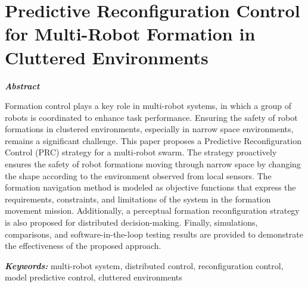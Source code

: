 \chapter{Predictive Reconfiguration Control for Multi-Robot Formation in Cluttered Environments}\label{paper3}

\vspace{1cm}

\noindent\textit{\textbf{Abstract}}

Formation control plays a key role in multi-robot systems, in which a group of robots is coordinated to enhance task performance. Ensuring the safety of robot formations in clustered environments, especially in narrow space environments, remains a significant challenge. This paper proposes a Predictive Reconfiguration Control (PRC) strategy for a multi-robot swarm. The strategy proactively ensures the safety of robot formations moving through narrow space by changing the shape according to the environment observed from local sensors. The formation navigation method is modeled as objective functions that express the requirements, constraints, and limitations of the system in the formation movement mission. Additionally, a perceptual formation reconfiguration strategy is also proposed for distributed decision-making. Finally, simulations, comparisons, and software-in-the-loop testing results are provided to demonstrate the effectiveness of the proposed approach.

\noindent\textbf{\textit{Keywords:}}
multi-robot system, distributed control, reconfiguration control, model predictive control, cluttered environments







